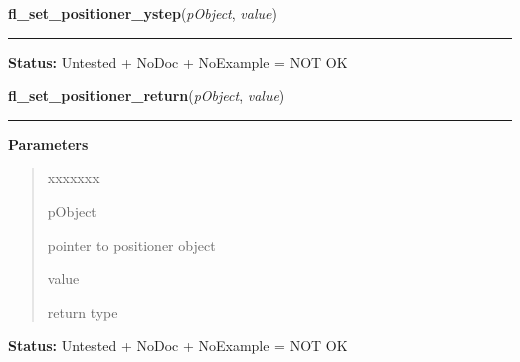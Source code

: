     \label{xformslib:library:fl_set_positioner_ystep}

    \vspace{0.5ex}

\hspace{.8\funcindent}\begin{boxedminipage}{\funcwidth}

    \raggedright \textbf{fl\_set\_positioner\_ystep}(\textit{pObject}, \textit{value})

    \vspace{-1.5ex}

    \rule{\textwidth}{0.5\fboxrule}
\setlength{\parskip}{2ex}
\setlength{\parskip}{1ex}
\textbf{Status:} Untested + NoDoc + NoExample = NOT OK



    \end{boxedminipage}

    \label{xformslib:library:fl_set_positioner_return}

    \vspace{0.5ex}

\hspace{.8\funcindent}\begin{boxedminipage}{\funcwidth}

    \raggedright \textbf{fl\_set\_positioner\_return}(\textit{pObject}, \textit{value})

    \vspace{-1.5ex}

    \rule{\textwidth}{0.5\fboxrule}
\setlength{\parskip}{2ex}
\setlength{\parskip}{1ex}
      \textbf{Parameters}
      \vspace{-1ex}

      \begin{quote}
        \begin{Ventry}{xxxxxxx}

          \item[pObject]

          pointer to positioner object

          \item[value]

          return type

        \end{Ventry}

      \end{quote}

\textbf{Status:} Untested + NoDoc + NoExample = NOT OK



    \end{boxedminipage}

